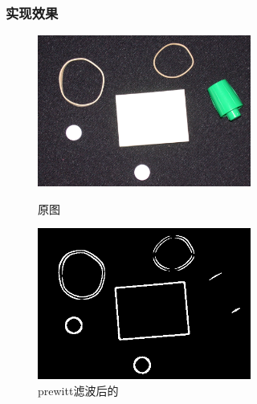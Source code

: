 \documentclass[11pt, a4paper, UTF8]{ctexart}
\begin{document}
\subsubsection{实现效果}

\begin{figure}[H]
  \centering
  \begin{minipage}[t]{0.48\textwidth}
  \centering
  \includegraphics[width=7cm]{rubberband_cap.png}
  \caption{原图}
  \end{minipage}
  \begin{minipage}[t]{0.48\textwidth}
  \centering
  \includegraphics[width=7cm]{prewitt_all_rubberband_cap.png}
  \caption{prewitt滤波后的}
  \end{minipage}
\end{figure}
\end{document}

